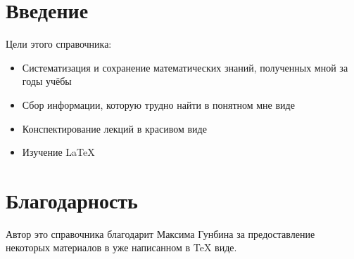 \chapter*{Введение}
Цели этого справочника:\\
\begin{itemize}
	\item Систематизация и сохранение математических знаний, полученных мной за годы учёбы
	\item Сбор информации, которую трудно найти в понятном мне виде
	\item Конспектирование лекций в красивом виде
	\item Изучение LaTeX
\end{itemize} 
\chapter*{Благодарность}
Автор это справочника благодарит Максима Гунбина за предоставление некоторых материалов в уже написанном в TeX виде.